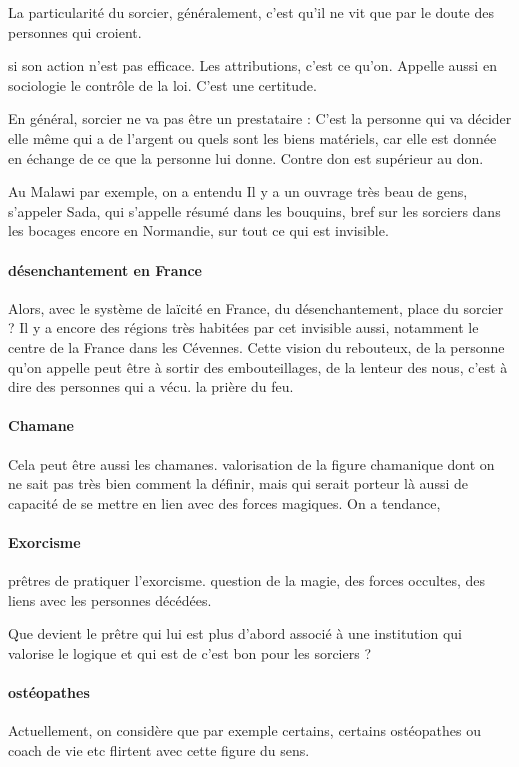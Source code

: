 La particularité du sorcier, généralement, c'est qu'il ne vit que par le doute des personnes qui croient. 

si son action n'est pas efficace.
Les attributions, c'est ce qu'on.
Appelle aussi en sociologie le contrôle de la loi. C'est une certitude. 

En général, sorcier ne va pas être un prestataire : C'est la personne qui va décider elle même qui a de l'argent ou quels sont les biens matériels, car elle est donnée en échange de ce que la personne lui donne. Contre don est supérieur au don.
\begin{Ex}
Au Malawi par exemple, on a entendu Il y a un ouvrage très beau de gens, s'appeler Sada, qui s'appelle résumé dans les bouquins, bref sur les sorciers dans les bocages encore en Normandie, sur tout ce qui est invisible.    
\end{Ex}
\paragraph{désenchantement en France}  Alors, avec le système de laïcité en France, du désenchantement, place du sorcier ? Il y a encore des régions très habitées par cet invisible aussi, notamment le centre de la France dans les Cévennes.
Cette vision du rebouteux, de la personne qu'on appelle peut être à  sortir des embouteillages, de la lenteur des nous, c'est à  dire des personnes qui a vécu. la prière du feu.



\paragraph{Chamane}
Cela peut être aussi les chamanes.  
 valorisation de la figure chamanique dont on ne sait pas très bien comment la définir, mais qui serait porteur là  aussi de capacité de se mettre en lien avec des forces magiques.
On a tendance, 
\paragraph{Exorcisme }prêtres de pratiquer l'exorcisme.  question de la magie, des forces occultes, des liens avec les personnes décédées.  

  Que devient le prêtre qui lui est plus d'abord associé à  une institution qui valorise le logique et qui est de c'est bon pour les sorciers ?

  \paragraph{ostéopathes}
Actuellement, on considère que par exemple certains, certains ostéopathes ou coach de vie etc flirtent avec cette figure du sens. 



